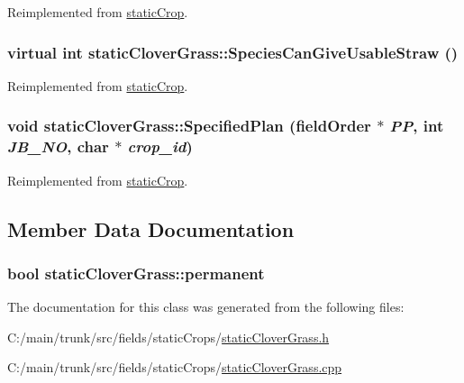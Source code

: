 Reimplemented from \hyperlink{classstatic_crop_ae4f07498c1616eab212386faf352d348}{staticCrop}.\hypertarget{classstatic_clover_grass_aaaa2e0c87530fc75182dbdcd2dac4571}{
\subsubsection[{SpeciesCanGiveUsableStraw}]{\setlength{\rightskip}{0pt plus 5cm}virtual int staticCloverGrass::SpeciesCanGiveUsableStraw ()}}
\label{classstatic_clover_grass_aaaa2e0c87530fc75182dbdcd2dac4571}


Reimplemented from \hyperlink{classstatic_crop_ab7763e4e6a0b9eff1788cb86ebad8170}{staticCrop}.\hypertarget{classstatic_clover_grass_a737916e73dc4466b5bc7c53013a4895e}{
\subsubsection[{SpecifiedPlan}]{\setlength{\rightskip}{0pt plus 5cm}void staticCloverGrass::SpecifiedPlan ({\bf fieldOrder} $\ast$ {\em PP}, \/  int {\em JB\_\-NO}, \/  char $\ast$ {\em crop\_\-id})}}
\label{classstatic_clover_grass_a737916e73dc4466b5bc7c53013a4895e}


Reimplemented from \hyperlink{classstatic_crop_af19d8a1e4f4833325f6712c22ede8b45}{staticCrop}.

\subsection{Member Data Documentation}
\hypertarget{classstatic_clover_grass_a92eeec31d30a8fbbe716a35a82603bba}{
\subsubsection[{permanent}]{\setlength{\rightskip}{0pt plus 5cm}bool {\bf staticCloverGrass::permanent}}}
\label{classstatic_clover_grass_a92eeec31d30a8fbbe716a35a82603bba}


The documentation for this class was generated from the following files:\begin{DoxyCompactItemize}
\item 
C:/main/trunk/src/fields/staticCrops/\hyperlink{static_clover_grass_8h}{staticCloverGrass.h}\item 
C:/main/trunk/src/fields/staticCrops/\hyperlink{static_clover_grass_8cpp}{staticCloverGrass.cpp}\end{DoxyCompactItemize}
